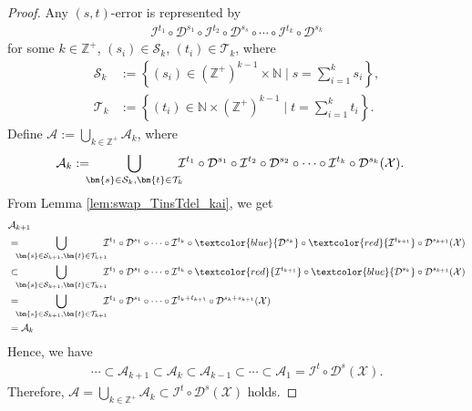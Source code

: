 \documentclass[reprint,amsmath,amssymb,aps,]{revtex4-2}
\theoremstyle{definition}
\newcommand{\R}[1]{\textcolor{red}{#1}}
\newcommand{\B}[1]{\textcolor{blue}{#1}}
\newcommand{\SET}[1]{\mathbb{#1}}
\newcommand{\Z}{\SET{Z}}
\newcommand{\N}{\SET{N}}
\newcommand{\1}{\mbox{1}\hspace{-0.25em}\mbox{l}}%
\newcommand{\QU}[1]{\mathcal{#1}}
\begin{document}
\begin{proof}
  Any $(s,t)$-error is represented by
  \begin{align*}
    \QU{I}^{t_{1}} \circ \QU{D}^{s_{1}} \circ
    \QU{I}^{t_{2}} \circ \QU{D}^{s_{s}} \circ
    \cdots \circ
    \QU{I}^{t_{k}} \circ \QU{D}^{s_{k}}
  \end{align*}
  for some $k \in \Z^+$,
  $(s_i) \in \QU{S}_k$,
  $(t_i) \in \QU{T}_k$,
  where
  \begin{align*}
    \QU{S}_k
    &:=
    \left\{
    (s_i)
    \in
    (\Z^+)^{k-1}
    \times
    \N
    \mid
    s = \sum_{i=1}^k s_{i}
    \right\},\\
    \QU{T}_k
    &:=
    \left\{
    (t_i)
    \in
    \N
    \times
    (\Z^+)^{k-1}
    \mid
    t = \sum_{i=1}^k t_{i}
    \right\}.
  \end{align*} 
  Define $\QU{A} := \bigcup_{k \in \Z^+} \QU{A}_k$,
  where
  \begin{align*}
    \QU{A}_k
    &:=
    \hspace*{-2mm}
    \bigcup_{\bm{s} \in \QU{S}_k, \bm{t} \in \QU{T}_k}
    \hspace*{-2mm}
    \QU{I}^{t_{1}} \circ \QU{D}^{s_{1}} \circ
    \QU{I}^{t_{2}} \circ \QU{D}^{s_{2}} \circ
    \cdots \circ
    \QU{I}^{t_{k}} \circ \QU{D}^{s_{k}}
    (\QU{X}).
  \end{align*}    
  From Lemma \ref{lem:swap_TinsTdel_kai},
  we get
  \begin{align*}
    &\QU{A}_{k+1}\\
    &=
    \hspace*{-2mm}
    \bigcup_{\bm{s} \in \QU{S}_{k+1}, \bm{t} \in \QU{T}_{k+1}}
    \hspace*{-2mm}
    \QU{I}^{t_{1}} \circ \QU{D}^{s_{1}} \circ
    \cdots \circ
    \QU{I}^{t_{k}} \circ \B{\QU{D}^{s_{k}}} \circ
    \R{\QU{I}^{t_{k+1}}} \circ \QU{D}^{s_{k+1}}
    (\QU{X})\\
    &\subset
    \hspace*{-2mm}
    \bigcup_{\bm{s} \in \QU{S}_{k+1}, \bm{t} \in \QU{T}_{k+1}}
    \hspace*{-2mm}
    \QU{I}^{t_{1}} \circ \QU{D}^{s_{1}} \circ
    \cdots \circ
    \QU{I}^{t_{k}} \circ \R{\QU{I}^{t_{k+1}}} \circ
    \B{\QU{D}^{s_{k}}} \circ \QU{D}^{s_{k+1}}
    (\QU{X})\\
    &=
    \hspace*{-2mm}
    \bigcup_{\bm{s} \in \QU{S}_{k+1}, \bm{t} \in \QU{T}_{k+1}}
    \hspace*{-2mm}
    \QU{I}^{t_{1}} \circ \QU{D}^{s_{1}} \circ
    \cdots \circ
    \QU{I}^{t_{k}+t_{k+1}} \circ
    \QU{D}^{s_{k}+s_{k+1}}
    (\QU{X})\\
    &=
    \QU{A}_{k}
  \end{align*}
  Hence,
  we have
  \begin{align*}
    \cdots
    \subset \QU{A}_{k+1}
    \subset \QU{A}_{k}
    \subset \QU{A}_{k-1}
    \subset 
    \cdots    
    \subset \QU{A}_{1}
    =
    \QU{I}^t \circ \QU{D}^s(\QU{X}).
  \end{align*}
  Therefore,
  $\QU{A} = \bigcup_{k \in \Z^+} \QU{A}_k \subset \QU{I}^t \circ \QU{D}^s(\QU{X})$
  holds.
\end{proof}
\end{document}
